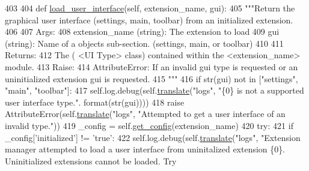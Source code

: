 \begin{DoxyCode}
403 
404     \textcolor{keyword}{def }\hyperlink{classcommotion__client_1_1utils_1_1extension__manager_1_1ExtensionManager_a923e4fe2b6bc682d9ccca7820cf2f3f3}{load\_user\_interface}(self, extension\_name, gui):
405         \textcolor{stringliteral}{"""Return the graphical user interface (settings, main, toolbar) from an initialized extension.}
406 \textcolor{stringliteral}{}
407 \textcolor{stringliteral}{        Args:}
408 \textcolor{stringliteral}{          extension\_name (string): The extension to load}
409 \textcolor{stringliteral}{          gui (string): Name of a objects sub-section. (settings, main, or toolbar)}
410 \textcolor{stringliteral}{}
411 \textcolor{stringliteral}{        Returns:}
412 \textcolor{stringliteral}{          The ( <UI Type> class) contained within the <extension\_name> module.}
413 \textcolor{stringliteral}{        Raise:}
414 \textcolor{stringliteral}{          AttributeError: If an invalid gui type is requested or an uninitialized extension gui is
       requested.}
415 \textcolor{stringliteral}{        """}
416         \textcolor{keywordflow}{if} str(gui) \textcolor{keywordflow}{not} \textcolor{keywordflow}{in} [\textcolor{stringliteral}{"settings"}, \textcolor{stringliteral}{"main"}, \textcolor{stringliteral}{"toolbar"}]:
417             self.log.debug(self.\hyperlink{classcommotion__client_1_1utils_1_1extension__manager_1_1ExtensionManager_a2cfd032ca383c3fd6f0f52b99b6dd67c}{translate}(\textcolor{stringliteral}{"logs"}, \textcolor{stringliteral}{"\{0\} is not a supported user interface type."}.
      format(str(gui))))
418             \textcolor{keywordflow}{raise} AttributeError(self.\hyperlink{classcommotion__client_1_1utils_1_1extension__manager_1_1ExtensionManager_a2cfd032ca383c3fd6f0f52b99b6dd67c}{translate}(\textcolor{stringliteral}{"logs"}, \textcolor{stringliteral}{"Attempted to get a user interface of an
       invalid type."}))
419         \_config = self.\hyperlink{classcommotion__client_1_1utils_1_1extension__manager_1_1ExtensionManager_a7f811f5c953b4208d9af942c9c173dbf}{get\_config}(extension\_name)
420         \textcolor{keywordflow}{try}:
421             \textcolor{keywordflow}{if} \_config[\textcolor{stringliteral}{'initialized'}] != \textcolor{stringliteral}{'true'}:
422                 self.log.debug(self.\hyperlink{classcommotion__client_1_1utils_1_1extension__manager_1_1ExtensionManager_a2cfd032ca383c3fd6f0f52b99b6dd67c}{translate}(\textcolor{stringliteral}{"logs"}, \textcolor{stringliteral}{"Extension manager attempted to load a user
       interface from uninitalized extension \{0\}. Uninitialized extensions cannot be loaded. Try
}
\end{DoxyCode}
